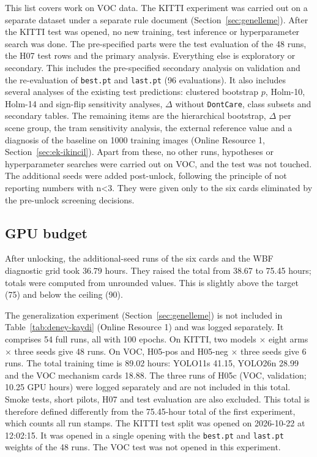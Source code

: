 This list covers work on VOC data. The KITTI experiment was carried out on a separate dataset under a separate rule document (Section~\ref{sec:genelleme}). After the KITTI test was opened, no new training, test inference or hyperparameter search was done. The pre-specified parts were the test evaluation of the 48 runs, the H07 test rows and the primary analysis. Everything else is exploratory or secondary. This includes the pre-specified secondary analysis on validation and the re-evaluation of \texttt{best.pt} and \texttt{last.pt} (96 evaluations). It also includes several analyses of the existing test predictions: clustered bootstrap $p$, Holm-10, Holm-14 and sign-flip sensitivity analyses, $\Delta$ without \texttt{DontCare}, class subsets and secondary tables. The remaining items are the hierarchical bootstrap, $\Delta$ per scene group, the tram sensitivity analysis, the external reference value and a diagnosis of the baseline on 1000 training images (Online Resource 1, Section~\ref{sec:ek-ikincil}). Apart from these, no other runs, hypotheses or hyperparameter searches were carried out on VOC, and the test was not touched. The additional seeds were added post-unlock, following the principle of not reporting numbers with n<3. They were given only to the six cards eliminated by the pre-unlock screening decisions.

\subsection{GPU budget}\label{sec:ek-butce}
After unlocking, the additional-seed runs of the six cards and the WBF diagnostic grid took 36.79 hours. They raised the total from 38.67 to 75.45 hours; totals were computed from unrounded values. This is slightly above the target (75) and below the ceiling (90).

The generalization experiment (Section~\ref{sec:genelleme}) is not included in Table~\ref{tab:deney-kaydi} (Online Resource 1) and was logged separately. It comprises 54 full runs, all with 100 epochs. On KITTI, two models $\times$ eight arms $\times$ three seeds give 48 runs. On VOC, H05-pos and H05-neg $\times$ three seeds give 6 runs. The total training time is 89.02 hours: YOLO11s 41.15, YOLO26n 28.99 and the VOC mechanism cards 18.88. The three runs of H05c (VOC, validation; 10.25 GPU hours) were logged separately and are not included in this total. Smoke tests, short pilots, H07 and test evaluation are also excluded. This total is therefore defined differently from the 75.45-hour total of the first experiment, which counts all run stamps. The KITTI test split was opened on 2026-10-22 at 12:02:15. It was opened in a single opening with the \texttt{best.pt} and \texttt{last.pt} weights of the 48 runs. The VOC test was not opened in this experiment.

